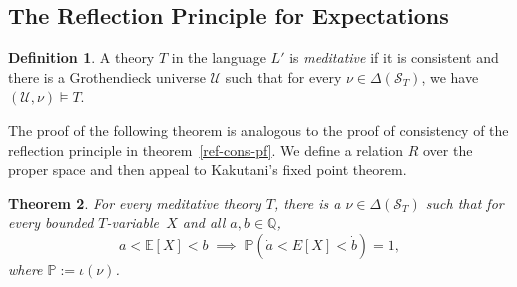 \documentclass[12pt]{article}
\newcommand{\PP}{\mathbb{P}}
\newcommand{\EE}{\mathbb{E}}
\newcommand{\QQ}{\mathbb{Q}}
\newcommand{\cL}{L'}
\newcommand{\cS}{\mathcal{S}}
\newcommand{\cU}{\mathcal{U}}
\newcommand{\Tvar}{$T$-variable}
\theoremstyle{plain}
\newtheorem{theorem}{Theorem}[subsection]
\theoremstyle{definition}
\newtheorem{definition}[theorem]{Definition}
\theoremstyle{remark}
\begin{document}
\subsection{The Reflection Principle for Expectations}
\begin{definition}
A theory $T$ in the language $\cL$ is \emph{meditative} if it is consistent and there is a Grothendieck universe $\cU$ such that for every $\nu\in\Delta(\cS_T)$, we have $(\cU,\nu)\vDash T$.
\end{definition}
The proof of the following theorem is analogous to the proof of consistency of the reflection principle in theorem~\ref{ref-cons-pf}.
We define a relation $R$ over the proper space and then appeal to Kakutani's fixed point theorem.
\begin{theorem}
For every meditative theory $T$, there is a $\nu\in\Delta(\cS_T)$ such that for every bounded \Tvar{}~$X$ and all $a,b\in\QQ$,
\[a<\EE[X]<b\;\implies\;\PP(\dot a < E[X] < \dot b) = 1,\]
where $\PP:=\iota(\nu)$.
\end{theorem}
\end{document}
